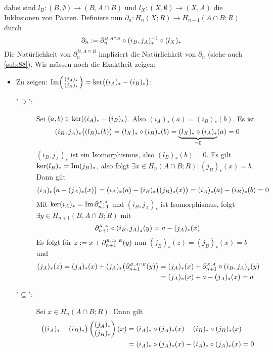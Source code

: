 dabei sind $l_B \colon (B,\emptyset) \to (B,A \cap B)$ und $l_X \colon (X, \emptyset) \to (X,A)$ die Inklusionen von Paaren.
Definiere nun $\partial_n \colon H_n(X;R) \to H_{n-1}(A\cap B;R)$ durch
\[
	\partial_n := \rand{B, A\cap B}_n \circ  (i_B,j_A)_*^{-1} \circ (l_X)_* 
\]
Die Natürlichkeit von $\partial_{n}^{B,A \cap B}$ impliziert die Natürlichkeit von $\partial_n$ (siehe auch \ref{sub:88}). Wir müssen noch die Exaktheit zeigen:
\begin{itemize}
	\item Zu zeigen: $\im \begin{psmallmatrix} (j_A)_* \\ (j_B)_* \end{psmallmatrix} = \ker \enbrace[\big]{(i_A)_* - (i_B)_*} $: 
	\begin{description}
		\item["$\supseteq $":] Sei $(a,b) \in \ker \enbrace*{(i_A)_* - (i_B)_*}$. Also $(i_A)_*(a) = (i_B)_*(b)$. Es ist 
		\[
			(i_B,j_A)_* \enbrace[\big]{(l_B)_*(b)} = (l_X)_* \circ (i_B)_* (b) = \underbrace{(l_X)_* \circ (i_A)_*}_{=0}(a)= 0 
		\]
		$(i_B,j_A)_*$ ist ein Isomorphismus, also $(l_B)_*(b)=0$. Es gilt $\ker (l_B)_* = \im (j_B)_*$, also folgt $\exists x \in H_n(A \cap B;R) : (j_B)_*(x)=b$. Dann gilt
		\[
			(i_A)_* \enbrace[\big]{a - (j_A)_*(x)} = (i_A)_*(a) - (i_B)_* \enbrace[\big]{(j_B)_* (x)} = (i_A)_*(a) - (i_B)_* (b) = 0  
		\]
		Mit $\ker (i_A)_*  =\im \rand{X,A}_{n+1}$ und $(i_B,j_A)_*$ ist Isomorphismus, folgt $\exists y \in H_{n+1}(B,A\cap B;R)$ mit 
		\[
			\rand{X,A}_{n+1} \circ  \enbrace*{i_B,j_A}_* (y) = a - (j_A)_*(x) 
		\]
		Es folgt für $z := x + \rand{B,A \cap B}_{n+1}(y)$ nun $(j_B)_*(z) =(j_B)_*(x) = b$ und 
		\begin{align*}
			(j_A)_*(z) = (j_A)_*(x) + (j_A)_* \enbrace[\big]{\rand{B,A \cap B}_{n+1}(y)} &= (j_A)_*(x) + \rand{X,A}_{n+1} \circ  \enbrace*{i_B, j_A}_*(y) \\ 
			&= (j_A)_*(x) + a - (j_A)_*(x) = a  
		\end{align*}
		\item["$\subseteq$":] Sei $x \in H_n(A\cap B;R)$. Dann gilt
		\begin{align*}
			\enbrace[\big]{(i_A)_* - (i_B)_*} \begin{pmatrix}
				(j_A)_* \\ (j_B)_*
			\end{pmatrix}  (x) &= (i_A)_* \circ (j_A)_* (x) - (i_B)_* \circ (j_B)_*(x) \\
			&= (i_A)_* \circ (j_A)_* (x) - (i_A)_* \circ (j_A)_* (x) = 0

\end{align*}
\end{description}
\end{itemize}
